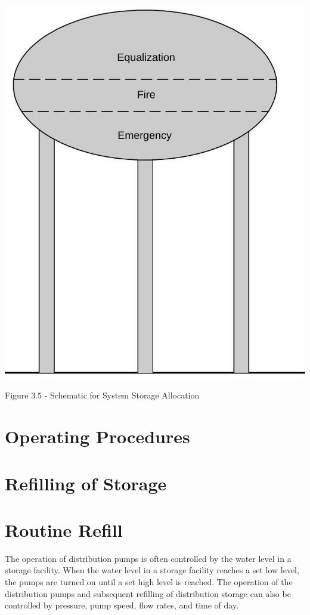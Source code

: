 \documentclass[10pt]{article}
\begin{document}
\includegraphics[max width=\textwidth]{2022_10_30_098bb5f44c5986ff92a9g-54}

Figure $3.5$ - Schematic for System Storage Allocation

\section{Operating Procedures}
\section{Refilling of Storage}
\section{Routine Refill}
The operation of distribution pumps is often controlled by the water level in a storage facility. When the water level in a storage facility reaches a set low level, the pumps are turned on until a set high level is reached. The operation of the distribution pumps and subsequent refilling of distribution storage can also be controlled by pressure, pump speed, flow rates, and time of day.
\end{document}

